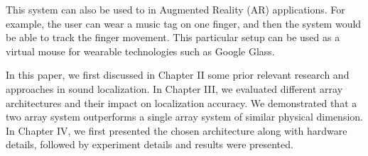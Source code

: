 This system can also be used to in Augmented Reality (AR) applications. For example, the user can wear a music tag on one finger, and then the system would be able to track the finger movement. This particular setup can be used as a virtual mouse for wearable technologies such as Google Glass. 


In this paper, we first discussed in Chapter II some prior relevant research and approaches in sound localization. In Chapter III, we evaluated different array architectures and their impact on localization accuracy. We demonstrated that a two array system outperforms a single array system of similar physical dimension. In Chapter IV, we first presented the chosen architecture along with hardware details, followed by experiment details and results were presented. 
